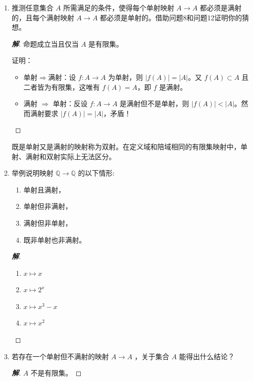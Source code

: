 \documentclass[12pt]{ctexart}
\newenvironment{solution}{\begin{proof}[\indent\bf 解]}{\end{proof}}
\begin{document}
{\begin{enumerate}
\begin{solution}
    满射不单射：$n \mapsto \left\lfloor \frac{n}{2} \right\rfloor$
  \end{solution}

\item  推测任意集合 \(A\) 所需满足的条件，使得每个单射映射 \(A \rightarrow  A\) 都必须是满射的，且每个满射映射 \(A \rightarrow  A\) 都必须是单射的。借助问题8和问题12证明你的猜想。

  \begin{solution}
    命题成立当且仅当 $A$ 是有限集。

    证明：
    \begin{itemize}
    \item 单射$\Rightarrow$满射：设 $f: A\to A$ 为单射，则 $\left| f(A) \right| = \left| A \right|$。又 $f(A)\subset A$ 且二者皆为有限集，这唯有 $f(A) = A$，即 $f$ 是满射。
    \item 满射 $\Rightarrow$ 单射：反设 $f : A\to A$ 是满射但不是单射，则 $\left| f(A) \right| < \left| A \right|$。然而满射要求 $\left| f(A) \right| = \left| A \right|$，矛盾！
    \end{itemize}
  \end{solution}

  
既是单射又是满射的映射称为双射。在定义域和陪域相同的有限集映射中，单射、满射和双射实际上无法区分。

\item  举例说明映射 \(\mathbb{Q} \rightarrow  \mathbb{Q}\) 的以下情形:
\begin{enumerate}
\item 单射且满射，

\item  单射但非满射，

\item  满射但非单射，

\item  既非单射也非满射。
\end{enumerate}

\begin{solution}
  \begin{enumerate}
  \item $x\mapsto x$
  \item $x\mapsto 2^x$
  \item $x\mapsto x^3 - x$
  \item $x\mapsto x^2$
  \end{enumerate}
\end{solution}

 
\item 若存在一个单射但不满射的映射 \(A \rightarrow  A\) ，关于集合 \(A\) 能得出什么结论？
  \begin{solution}
    $A$ 不是有限集。
  \end{solution}
\end{enumerate}

}
\end{document}
